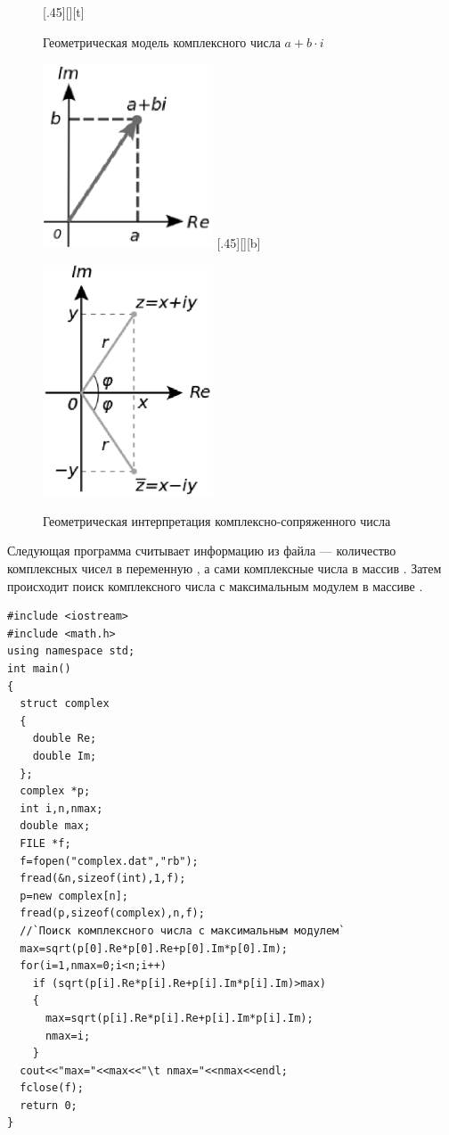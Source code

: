 \begin{figure}[H]
\begin{floatrow}
[.45\textwidth][\FBheight][t]
{\caption{Геометрическая  модель комплексного числа  $a+b\cdot i$}
\label{ch09:refDrawing0}}
{\includegraphics[width=0.45\textwidth,keepaspectratio]{img/ris_9_1}}\hspace*{0.05\textwidth}
%
[.45\textwidth][\FBheight][b]
{\caption{Геометрическая интерпретация комплексно-сопряженного числа}
\label{ch09:refDrawing1}}
{\includegraphics[width=0.45\textwidth,keepaspectratio]{img/ris_9_2}}
\end{floatrow}
\end{figure}


Следующая программа считывает информацию из файла  --- количество комплексных
чисел в переменную , а сами комплексные числа в массив .
 Затем происходит поиск комплексного числа с максимальным модулем в массиве .

\begin{lstlisting}
#include <iostream>
#include <math.h>
using namespace std;
int main()
{
  struct complex
  {
    double Re;
    double Im;
  };
  complex *p;
  int i,n,nmax;
  double max;
  FILE *f;
  f=fopen("complex.dat","rb");
  fread(&n,sizeof(int),1,f);
  p=new complex[n];
  fread(p,sizeof(complex),n,f);
  //`Поиск комплексного числа с максимальным модулем`
  max=sqrt(p[0].Re*p[0].Re+p[0].Im*p[0].Im);
  for(i=1,nmax=0;i<n;i++)
    if (sqrt(p[i].Re*p[i].Re+p[i].Im*p[i].Im)>max)
    {
      max=sqrt(p[i].Re*p[i].Re+p[i].Im*p[i].Im);
      nmax=i;
    }
  cout<<"max="<<max<<"\t nmax="<<nmax<<endl;
  fclose(f);
  return 0;
}
\end{lstlisting}


